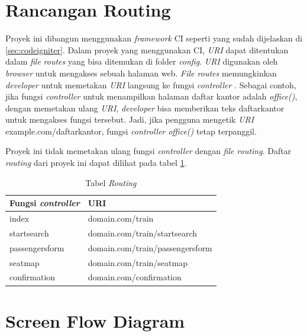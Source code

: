 \section{Rancangan Routing}
\label{sec:rancanganrouting} 

Proyek ini dibangun menggunakan \textit{framework} CI seperti yang sudah dijelaskan di \ref{sec:codeigniter}. Dalam proyek yang menggunakan CI, \textit{URI} dapat ditentukan dalam \textit{file} \textit{routes} yang bisa ditemukan di folder \textit{config}. \textit{URI} digunakan oleh \textit{browser} untuk mengakses sebuah halaman web. \textit{File routes} memungkinkan \textit{developer} untuk memetakan \textit{URI} langsung ke fungsi \textit{controller} . Sebagai contoh, jika fungsi \textit{controller} untuk menampilkan halaman daftar kantor adalah \textit{office()}, dengan memetakan ulang \textit{URI}, \textit{developer} bisa memberikan teks daftarkantor untuk mengakses fungsi tersebut. Jadi, jika pengguna mengetik \textit{URI} example.com/daftarkantor, fungsi \textit{controller} \textit{office()} tetap terpanggil.

Proyek ini tidak memetakan ulang fungsi \textit{controller} dengan \textit{file routing}. Daftar \textit{routing} dari proyek ini dapat dilihat pada tabel \ref{tab:tabelrouting}.

\begin{table}[H]
	\centering 
	\caption{Tabel \textit{Routing}}
	\label{tab:tabelrouting}
	\begin{tabular}{|l|l|}
		\hline
		Fungsi \textit{controller} & URI\\
		\hline
		
		\hline
		index & domain.com/train\\
		\hline
		startsearch & domain.com/train/startsearch\\
		\hline
		passengersform & domain.com/train/passengersform\\
		\hline
		seatmap & domain.com/train/seatmap\\
		\hline
		confirmation & domain.com/confirmation\\
		\hline
        
	\end{tabular} 
\end{table}

\section{Screen Flow Diagram}
\label{sec:screenflowdiagram}

